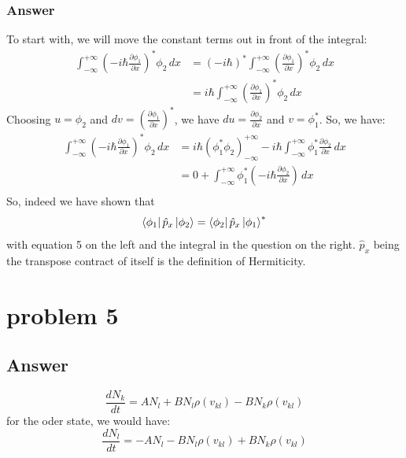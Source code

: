 \documentclass{article}
\begin{document}
\subsubsection{Answer}
To start with, we will move the constant terms out in front of the integral:
\begin{equation}
    \begin{split}
        \int_{-\infty}^{+\infty} \left(-i\hbar \frac{\partial \phi_1}{\partial x}\right)^* \phi_2 \, dx &= (-i\hbar)^* \int_{-\infty}^{+\infty} \left(\frac{\partial \phi_1}{\partial x}\right)^* \phi_2 \, dx \\
        &= i\hbar \int_{-\infty}^{+\infty} \left(\frac{\partial \phi_1}{\partial x}\right)^* \phi_2 \, dx
    \end{split}
\end{equation}
Choosing $u=\phi_2$ and $dv=\left(\frac{\partial \phi_1}{\partial x}\right)^*$, we have $du=\frac{\partial \phi _{2}}{\partial x}$ and $v=\phi_1^*$. So, we have:
\begin{equation}
    \begin{split}
        \int_{-\infty}^{+\infty} \left(-i\hbar \frac{\partial \phi_1}{\partial x}\right)^* \phi_2 \, dx &= i\hbar \left(\phi_1^*\phi_2\right)_{-\infty}^{+\infty} - i\hbar \int_{-\infty}^{+\infty} \phi_1^* \frac{\partial \phi_2}{\partial x} \, dx \\
        &= 0+\int_{-\infty}^{+\infty} \phi_1^* \left(-i\hbar \frac{\partial \phi_2}{\partial x}\right) \, dx \\
    \end{split}
\end{equation}
So, indeed we have shown that 
\begin{equation}
    \bra{\phi _{1}}\hat{p}_x\ket{\phi _{2}} = \bra{\phi _{2}}\hat{p}_x\ket{\phi _{1}}^*
\end{equation}
with equation 5 on the left and the integral in the question on the right.
$\hat{p}_x$ being the transpose contract of itself is the definition of Hermiticity.
\section{problem 5}
\subsection{Answer}
\begin{equation}
    \frac{dN_{k}}{dt} = A N_l + B N_l \rho (v_{kl})-BN_k \rho (v_{kl})
\end{equation}
for the oder state, we would have:
\begin{equation}
    \frac{dN_{l}}{dt} = -A N_l - B N_l \rho (v_{kl})+BN_k \rho (v_{kl})
\end{equation}
\end{document}
